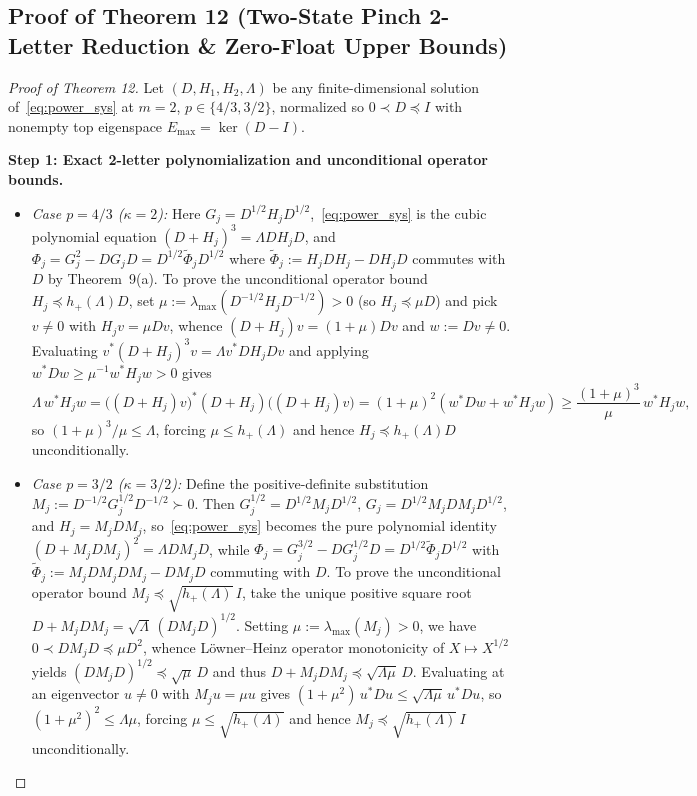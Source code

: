 \documentclass[10pt,letterpaper]{article}
\begin{document}
\subsection{Proof of Theorem 12 (Two-State Pinch 2-Letter Reduction \& Zero-Float Upper Bounds)}

\begin{proof}[Proof of Theorem 12]
Let $(D, H_1, H_2, \Lambda)$ be any finite-dimensional solution of~\eqref{eq:power_sys} at $m = 2$, $p \in \{4/3, 3/2\}$, normalized so $0 \prec D \preceq I$ with nonempty top eigenspace $E_{\max} = \ker(D - I)$.

\textbf{Step 1: Exact 2-letter polynomialization and unconditional operator bounds.}
\begin{itemize}[leftmargin=1.5em,itemsep=2pt]
  \item \emph{Case $p = 4/3$ ($\kappa = 2$):} Here $G_j = D^{1/2} H_j D^{1/2}$,~\eqref{eq:power_sys} is the cubic polynomial equation $(D + H_j)^3 = \Lambda D H_j D$, and $\Phi_j = G_j^2 - D G_j D = D^{1/2} \widetilde{\Phi}_j D^{1/2}$ where $\widetilde{\Phi}_j := H_j D H_j - D H_j D$ commutes with $D$ by Theorem~9(a). To prove the unconditional operator bound $H_j \preceq h_+(\Lambda) D$, set $\mu := \lambda_{\max}(D^{-1/2} H_j D^{-1/2}) > 0$ (so $H_j \preceq \mu D$) and pick $v \neq 0$ with $H_j v = \mu D v$, whence $(D + H_j)v = (1 + \mu) D v$ and $w := D v \neq 0$. Evaluating $v^*(D + H_j)^3 v = \Lambda v^* D H_j D v$ and applying $w^* D w \ge \mu^{-1} w^* H_j w > 0$ gives
  \[
    \Lambda\, w^* H_j w
    = \bigl((D+H_j)v\bigr)^*(D+H_j)\bigl((D+H_j)v\bigr)
    = (1+\mu)^2(w^* D w + w^* H_j w)
    \ge \frac{(1+\mu)^3}{\mu}\, w^* H_j w,
  \]
  so $(1+\mu)^3/\mu \le \Lambda$, forcing $\mu \le h_+(\Lambda)$ and hence $H_j \preceq h_+(\Lambda) D$ unconditionally.
  \item \emph{Case $p = 3/2$ ($\kappa = 3/2$):} Define the positive-definite substitution $M_j := D^{-1/2} G_j^{1/2} D^{-1/2} \succ 0$. Then $G_j^{1/2} = D^{1/2} M_j D^{1/2}$, $G_j = D^{1/2} M_j D M_j D^{1/2}$, and $H_j = M_j D M_j$, so~\eqref{eq:power_sys} becomes the pure polynomial identity $(D + M_j D M_j)^2 = \Lambda D M_j D$, while $\Phi_j = G_j^{3/2} - D G_j^{1/2} D = D^{1/2} \widetilde{\Phi}_j D^{1/2}$ with $\widetilde{\Phi}_j := M_j D M_j D M_j - D M_j D$ commuting with $D$. To prove the unconditional operator bound $M_j \preceq \sqrt{h_+(\Lambda)}\,I$, take the unique positive square root $D + M_j D M_j = \sqrt{\Lambda}\,(D M_j D)^{1/2}$. Setting $\mu := \lambda_{\max}(M_j) > 0$, we have $0 \prec D M_j D \preceq \mu D^2$, whence L\"owner--Heinz operator monotonicity of $X \mapsto X^{1/2}$ yields $(D M_j D)^{1/2} \preceq \sqrt{\mu}\,D$ and thus $D + M_j D M_j \preceq \sqrt{\Lambda\mu}\,D$. Evaluating at an eigenvector $u \neq 0$ with $M_j u = \mu u$ gives $(1 + \mu^2)\,u^* D u \le \sqrt{\Lambda\mu}\,u^* D u$, so $(1+\mu^2)^2 \le \Lambda\mu$, forcing $\mu \le \sqrt{h_+(\Lambda)}$ and hence $M_j \preceq \sqrt{h_+(\Lambda)}\,I$ unconditionally.
\end{itemize}


\end{proof}
\end{document}
